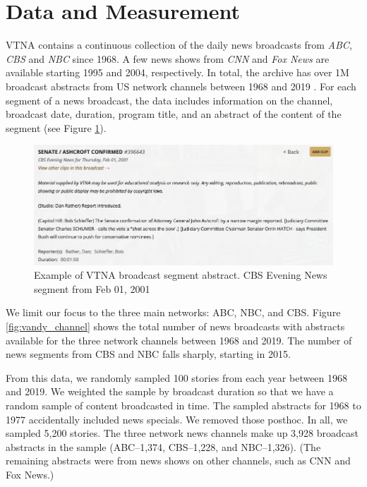 \documentclass[12pt, letterpaper]{article}
\begin{document}
\section*{Data and Measurement}
VTNA contains a continuous collection of the daily news broadcasts from \emph{ABC}, \emph{CBS} and \emph{NBC} since 1968. A few news shows from \emph{CNN} and \emph{Fox News} are available starting 1995 and 2004, respectively. In total, the archive has over 1M broadcast abstracts from US network channels between 1968 and 2019 \citep{lynch1996vanderbilt, soodlaohaprapanon2020}. For each segment of a news broadcast, the data includes information on the channel, broadcast date, duration, program title, and an abstract of the content of the segment (see Figure \ref{fig:vandy_abstract}).

\begin{figure}[H]
  \centering
  \caption{Example of VTNA broadcast segment abstract. CBS Evening News segment from Feb 01, 2001}
  \label{fig:vandy_abstract}
  \includegraphics[width=.8\linewidth]{../figs/fig_vtna_screenshot_4.png}
\end{figure}

We limit our focus to the three main networks: ABC, NBC, and CBS. Figure \ref{fig:vandy_channel} shows the total number of news broadcasts with abstracts available for the three network channels between 1968 and 2019. The number of news segments from CBS and NBC falls sharply, starting in 2015.

From this data, we randomly sampled 100 stories from each year between 1968 and 2019. We weighted the sample by broadcast duration so that we have a random sample of content broadcasted in time. The sampled abstracts for 1968 to 1977 accidentally included news specials. We removed those posthoc. In all, we sampled 5,200 stories. The three network news channels make up 3,928 broadcast abstracts in the sample (ABC--1,374, CBS--1,228, and NBC--1,326). (The remaining abstracts were from news shows on other channels, such as CNN and Fox News.)
\end{document}
